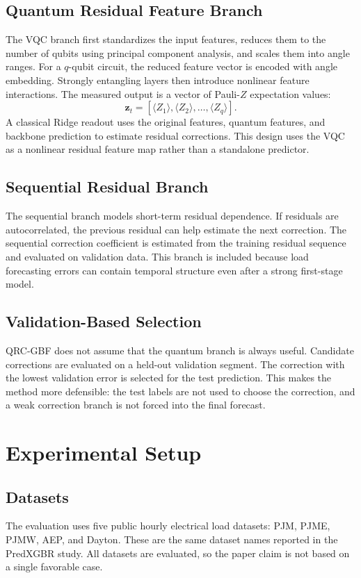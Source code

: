 \documentclass[11pt]{article}
\begin{document}
\subsection{Quantum Residual Feature Branch}
The VQC branch first standardizes the input features, reduces them to the number of qubits using principal component analysis, and scales them into angle ranges. For a $q$-qubit circuit, the reduced feature vector is encoded with angle embedding. Strongly entangling layers then introduce nonlinear feature interactions. The measured output is a vector of Pauli-$Z$ expectation values:
\begin{equation}
\mathbf{z}_t = [\langle Z_1 \rangle, \langle Z_2 \rangle, \ldots, \langle Z_q \rangle].
\end{equation}
A classical Ridge readout uses the original features, quantum features, and backbone prediction to estimate residual corrections. This design uses the VQC as a nonlinear residual feature map rather than a standalone predictor.

\subsection{Sequential Residual Branch}
The sequential branch models short-term residual dependence. If residuals are autocorrelated, the previous residual can help estimate the next correction. The sequential correction coefficient is estimated from the training residual sequence and evaluated on validation data. This branch is included because load forecasting errors can contain temporal structure even after a strong first-stage model.

\subsection{Validation-Based Selection}
QRC-GBF does not assume that the quantum branch is always useful. Candidate corrections are evaluated on a held-out validation segment. The correction with the lowest validation error is selected for the test prediction. This makes the method more defensible: the test labels are not used to choose the correction, and a weak correction branch is not forced into the final forecast.

\section{Experimental Setup}
\subsection{Datasets}
The evaluation uses five public hourly electrical load datasets: PJM, PJME, PJMW, AEP, and Dayton. These are the same dataset names reported in the PredXGBR study. All datasets are evaluated, so the paper claim is not based on a single favorable case.
\end{document}
